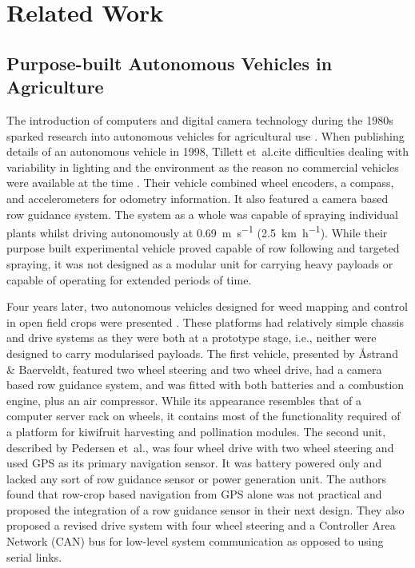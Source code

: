 \documentclass[preprint,authoryear,12pt]{elsarticle}
\begin{document}
\section{Related Work}
\label{sect:review}

    \subsection{Purpose-built Autonomous Vehicles in Agriculture}

        The introduction of computers and digital camera technology during the 1980s sparked research into autonomous vehicles for agricultural use \citep{Li2009}.
        When publishing details of an autonomous vehicle in 1998, Tillett et~al.\@ cite difficulties dealing with variability in lighting and the environment as the reason no commercial vehicles were available at the time \citep{Tillett1998}.
        Their vehicle combined wheel encoders, a compass, and accelerometers for odometry information.
        It also featured a camera based row guidance system.
        The system as a whole was capable of spraying individual plants whilst driving autonomously at \SI{0.69}{\meter\per\second} (\SI{2.5}{\kilo\meter\per\hour}).
        While their purpose built experimental vehicle proved capable of row following and targeted spraying, it was not designed as a modular unit for carrying heavy payloads or capable of operating for extended periods of time.


        Four years later, two autonomous vehicles designed for weed mapping and control in open field crops were presented \citep{Pedersen2002,Astrand2002}.
        These platforms had relatively simple chassis and drive systems as they were both at a prototype stage, i.e., neither were designed to carry modularised payloads.
        The first vehicle, presented by Åstrand \& Baerveldt, featured two wheel steering and two wheel drive, had a camera based row guidance system, and was fitted with both batteries and a combustion engine, plus an air compressor.
        While its appearance resembles that of a computer server rack on wheels, it contains most of the functionality required of a platform for kiwifruit harvesting and pollination modules.
        The second unit, described by Pedersen et~al.\@, was four wheel drive with two wheel steering and used GPS as its primary navigation sensor.
        It was battery powered only and lacked any sort of row guidance sensor or power generation unit.
        The authors found that row-crop based navigation from GPS alone was not practical and proposed the integration of a row guidance sensor in their next design.
        They also proposed a revised drive system with four wheel steering and a Controller Area Network (CAN) bus for low-level system communication as opposed to using serial links.
\end{document}
